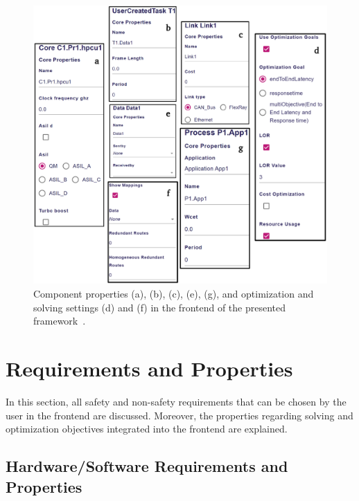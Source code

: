  
    \begin{figure}[ht]
 	\centering
 	\includegraphics[width=1\textwidth]{figures/req1.pdf}
 	\caption{Component properties (a), (b), (c), (e), (g), and optimization and solving settings (d) and (f) in the frontend of the presented framework~\cite{askaripoor2023designer}.}
 	\label{fig6}
    \end{figure}
 
    \section{Requirements and Properties}
    In this section, all safety and non-safety requirements that can be chosen by the user in the frontend are discussed. Moreover, the properties regarding solving and optimization objectives integrated into the frontend are explained.
 
    \subsection{Hardware/Software Requirements and Properties}
 
